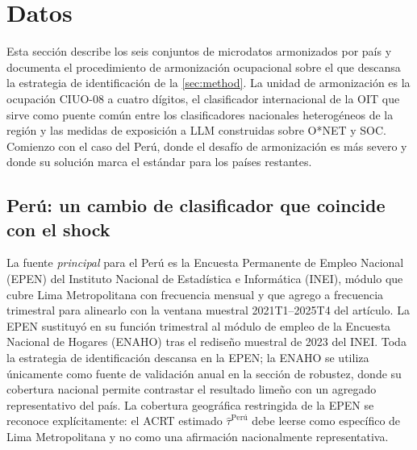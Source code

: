 \section{Datos}
\label{sec:data}

Esta secci\'{o}n describe los seis conjuntos de microdatos armonizados por pa\'{i}s y documenta el procedimiento de armonizaci\'{o}n ocupacional sobre el que descansa la estrategia de identificaci\'{o}n de la \cref{sec:method}. La unidad de armonizaci\'{o}n es la ocupaci\'{o}n CIUO-08 a cuatro d\'{i}gitos, el clasificador internacional de la OIT que sirve como puente com\'{u}n entre los clasificadores nacionales heterog\'{e}neos de la regi\'{o}n y las medidas de exposici\'{o}n a LLM construidas sobre O*NET y SOC. Comienzo con el caso del Per\'{u}, donde el desaf\'{i}o de armonizaci\'{o}n es m\'{a}s severo y donde su soluci\'{o}n marca el est\'{a}ndar para los pa\'{i}ses restantes.

\subsection{Per\'{u}: un cambio de clasificador que coincide con el shock}
\label{subsec:data_peru}

La fuente \emph{principal} para el Per\'{u} es la Encuesta Permanente de Empleo Nacional (EPEN) del Instituto Nacional de Estad\'{i}stica e Inform\'{a}tica (INEI), m\'{o}dulo que cubre Lima Metropolitana con frecuencia mensual y que agrego a frecuencia trimestral para alinearlo con la ventana muestral 2021T1--2025T4 del art\'{i}culo. La EPEN sustituy\'{o} en su funci\'{o}n trimestral al m\'{o}dulo de empleo de la Encuesta Nacional de Hogares (ENAHO) tras el redise\~{n}o muestral de 2023 del INEI. Toda la estrategia de identificaci\'{o}n descansa en la EPEN; la ENAHO se utiliza \'{u}nicamente como fuente de validaci\'{o}n anual en la secci\'{o}n de robustez, donde su cobertura nacional permite contrastar el resultado limeño con un agregado representativo del pa\'{i}s. La cobertura geogr\'{a}fica restringida de la EPEN se reconoce expl\'{i}citamente: el ACRT estimado $\hat\tau^{\text{Per\'{u}}}$ debe leerse como espec\'{i}fico de Lima Metropolitana y no como una afirmaci\'{o}n nacionalmente representativa.

